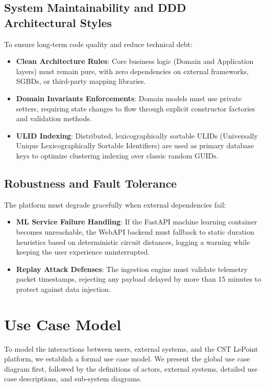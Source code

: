 \subsection{System Maintainability and DDD Architectural Styles}
To ensure long-term code quality and reduce technical debt:
\begin{itemize}
  \item \textbf{Clean Architecture Rules}: Core business logic (Domain and Application layers) must remain pure, with zero dependencies on external frameworks, SGBDs, or third-party mapping libraries.
  \item \textbf{Domain Invariants Enforcements}: Domain models must use private setters, requiring state changes to flow through explicit constructor factories and validation methods.
  \item \textbf{ULID Indexing}: Distributed, lexicographically sortable ULIDs (Universally Unique Lexicographically Sortable Identifiers) are used as primary database keys to optimize clustering indexing over classic random GUIDs.
\end{itemize}

\subsection{Robustness and Fault Tolerance}
The platform must degrade gracefully when external dependencies fail:
\begin{itemize}
  \item \textbf{ML Service Failure Handling}: If the FastAPI machine learning container becomes unreachable, the WebAPI backend must fallback to static duration heuristics based on deterministic circuit distances, logging a warning while keeping the user experience uninterrupted.
  \item \textbf{Replay Attack Defenses}: The ingestion engine must validate telemetry packet timestamps, rejecting any payload delayed by more than 15 minutes to protect against data injection.
\end{itemize}

\section{Use Case Model}

To model the interactions between users, external systems, and the CST LePoint platform, we establish a formal use case model. We present the global use case diagram first, followed by the definitions of actors, external systems, detailed use case descriptions, and sub-system diagrams.

